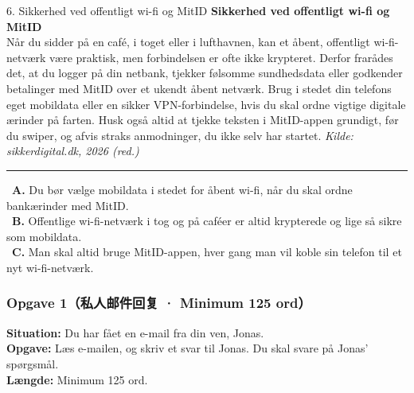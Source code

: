 \begin{emailbox}{6. Sikkerhed ved offentligt wi-fi og MitID}
\textbf{Sikkerhed ved offentligt wi-fi og MitID}\\
Når du sidder på en café, i toget eller i lufthavnen, kan et åbent, offentligt wi-fi-netværk være praktisk, men forbindelsen er ofte ikke krypteret. Derfor frarådes det, at du logger på din netbank, tjekker følsomme sundhedsdata eller godkender betalinger med MitID over et ukendt åbent netværk. Brug i stedet din telefons eget mobildata eller en sikker VPN-forbindelse, hvis du skal ordne vigtige digitale ærinder på farten. Husk også altid at tjekke teksten i MitID-appen grundigt, før du swiper, og afvis straks anmodninger, du ikke selv har startet.
\hfill {\small\textit{Kilde: sikkerdigital.dk, 2026 (red.)}}

\vspace{0.3em}
\hrule
\vspace{0.3em}
\small
\fbox{\phantom{X}}\ \textbf{A.} Du bør vælge mobildata i stedet for åbent wi-fi, når du skal ordne bankærinder med MitID.\\[0.25em]
\fbox{\phantom{X}}\ \textbf{B.} Offentlige wi-fi-netværk i tog og på caféer er altid krypterede og lige så sikre som mobildata.\\[0.25em]
\fbox{\phantom{X}}\ \textbf{C.} Man skal altid bruge MitID-appen, hver gang man vil koble sin telefon til et nyt wi-fi-netværk.
\end{emailbox}


\subsubsection*{Opgave 1（私人邮件回复 · Minimum 125 ord）}

\textbf{Situation:} Du har fået en e-mail fra din ven, Jonas.\\
\textbf{Opgave:} Læs e-mailen, og skriv et svar til Jonas. Du skal svare på Jonas' spørgsmål.\\
\textbf{Længde:} Minimum 125 ord.

